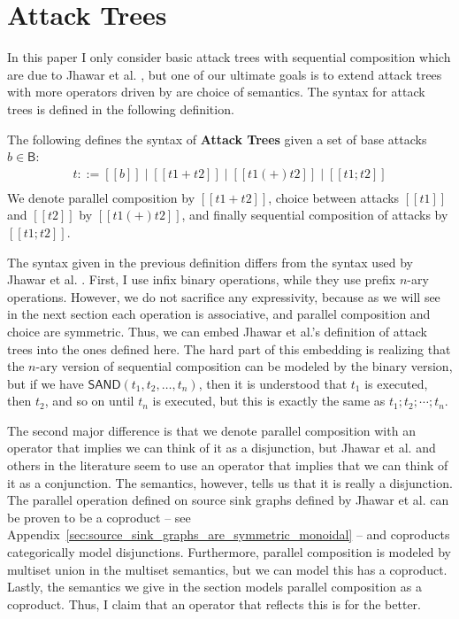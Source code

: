 \documentclass{llncs}
\begin{document}
\section{Attack Trees}
\label{sec:attack_trees}
In this paper I only consider basic attack trees with sequential
composition which are due to Jhawar et al. \cite{Jhawar:2015}, but one
of our ultimate goals is to extend attack trees with more operators
driven by are choice of semantics.  The syntax for attack trees is
defined in the following definition.
\begin{definition}
  \label{def:atrees}
  The following defines the syntax of \textbf{Attack Trees} given a set
  of base attacks $b \in \mathsf{B}$:
  \[
  \begin{array}{lll}
    t ::= [[b]] \mid [[t1 + t2]] \mid [[t1 (+) t2]] \mid [[t1;t2]]\\
  \end{array}
  \]
  We denote parallel composition by $[[t1 + t2]]$, choice between
  attacks $[[t1]]$ and $[[t2]]$ by $[[t1 (+) t2]]$, and finally
  sequential composition of attacks by $[[t1;t2]]$.
\end{definition}
The syntax given in the previous definition differs from the syntax
used by Jhawar et al. \cite{Jhawar:2015}.  First, I use infix binary
operations, while they use prefix $n$-ary operations. However, we do
not sacrifice any expressivity, because as we will see in the next
section each operation is associative, and parallel composition and
choice are symmetric.  Thus, we can embed Jhawar et al.'s definition
of attack trees into the ones defined here.  The hard part of this
embedding is realizing that the $n$-ary version of sequential
composition can be modeled by the binary version, but if we have
$\mathsf{SAND}(t_1,t_2,\ldots,t_n)$, then it is understood that $t_1$
is executed, then $t_2$, and so on until $t_n$ is executed, but this
is exactly the same as $t_1;t_2;\cdots;t_n$.

The second major difference is that we denote parallel composition
with an operator that implies we can think of it as a disjunction, but
Jhawar et al. and others in the literature seem to use an operator
that implies that we can think of it as a conjunction.  The semantics,
however, tells us that it is really a disjunction.  The parallel
operation defined on source sink graphs defined by Jhawar et
al. \cite{Jhawar:2015} can be proven to be a coproduct -- see
Appendix~\ref{sec:source_sink_graphs_are_symmetric_monoidal} -- and
coproducts categorically model disjunctions.  Furthermore, parallel
composition is modeled by multiset union in the multiset semantics,
but we can model this has a coproduct.  Lastly, the semantics we give
in the section models parallel composition as a coproduct.  Thus, I
claim that an operator that reflects this is for the better.
\end{document}

